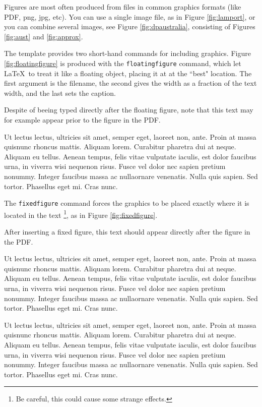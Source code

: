 Figures are most often produced from files in common graphics formats (like PDF, png, jpg, etc). You can use a single image file, as in Figure \ref{fig:lamport}, or you can combine several images, see Figure \ref{fig:dpaustralia}, consisting of Figures \ref{fig:aust} and \ref{fig:approx}.

The template provides two short-hand commands for including graphics. Figure \ref{fig:floatingfigure} is produced with the \texttt{floatingfigure} command, which let \LaTeX\ to treat it like a floating object, placing it at at the ``best" location. The first argument is the filename, the second gives the width as a fraction of the text width, and the last sets the caption.

\label{fig:floatingfigure}

Despite of beeing typed directly after the floating figure, note that this text may for example appear prior to the figure in the PDF.

Ut lectus lectus, ultricies sit amet, semper eget, laoreet non, ante. Proin at massa quisnunc rhoncus mattis. Aliquam lorem. Curabitur pharetra dui at neque. Aliquam eu tellus. Aenean tempus, felis vitae vulputate iaculis, est dolor faucibus urna, in viverra wisi nequenon risus. Fusce vel dolor nec sapien pretium nonummy. Integer faucibus massa ac nullaornare venenatis. Nulla quis sapien. Sed tortor. Phasellus eget mi. Cras nunc.

The \texttt{fixedfigure} command forces the graphics to be placed exactly where it is located in the text
\footnote{Be careful, this could cause some strange effects.}, 
as in Figure \ref{fig:fixedfigure}.

\label{fig:fixedfigure}

After inserting a fixed figure, this text should appear directly after the figure in the PDF.

Ut lectus lectus, ultricies sit amet, semper eget, laoreet non, ante. Proin at massa quisnunc rhoncus mattis. Aliquam lorem. Curabitur pharetra dui at neque. Aliquam eu tellus. Aenean tempus, felis vitae vulputate iaculis, est dolor faucibus urna, in viverra wisi nequenon risus. Fusce vel dolor nec sapien pretium nonummy. Integer faucibus massa ac nullaornare venenatis. Nulla quis sapien. Sed tortor. Phasellus eget mi. Cras nunc.

Ut lectus lectus, ultricies sit amet, semper eget, laoreet non, ante. Proin at massa quisnunc rhoncus mattis. Aliquam lorem. Curabitur pharetra dui at neque. Aliquam eu tellus. Aenean tempus, felis vitae vulputate iaculis, est dolor faucibus urna, in viverra wisi nequenon risus. Fusce vel dolor nec sapien pretium nonummy. Integer faucibus massa ac nullaornare venenatis. Nulla quis sapien. Sed tortor. Phasellus eget mi. Cras nunc.


